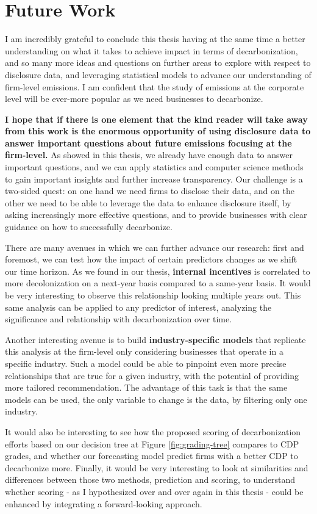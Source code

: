 \section{Future Work}
I am incredibly grateful to conclude this thesis having at the same time a better understanding on what it takes to achieve impact in terms of decarbonization, and so many more ideas and questions on further areas to explore with respect to disclosure data, and leveraging statistical models to advance our understanding of firm-level emissions. I am confident that the study of emissions at the corporate level will be ever-more popular as we need businesses to decarbonize. 

\textbf{I hope that if there is one element that the kind reader will take away from this work is the enormous opportunity of using disclosure data to answer important questions about future emissions focusing at the firm-level.} As showed in this thesis, we already have enough data to answer important questions, and we can apply statistics and computer science methods to gain important insights and further increase transparency. Our challenge is a two-sided quest: on one hand we need firms to disclose their data, and on the other we need to be able to leverage the data to enhance disclosure itself, by asking increasingly more effective questions, and to provide businesses with clear guidance on how to successfully decarbonize. 

There are many avenues in which we can further advance our research: first and foremost, we can test how the impact of certain predictors changes as we shift our time horizon. As we found in our thesis, \textbf{internal incentives} is correlated to more decolonization on a next-year basis compared to a same-year basis. It would be very interesting to observe this relationship looking multiple years out. This same analysis can be applied to any predictor of interest, analyzing the significance and relationship with decarbonization over time. 

Another interesting avenue is to build \textbf{industry-specific models} that replicate this analysis at the firm-level only considering businesses that operate in a specific industry. Such a model could be able to pinpoint even more precise relationships that are true for a given industry, with the potential of providing more tailored recommendation. The advantage of this task is that the same models can be used, the only variable to change is the data, by filtering only one industry. 

It would also be interesting to see how the proposed scoring of decarbonization efforts based on our decision tree at Figure \ref{fig:grading-tree} compares to CDP grades, and whether our forecasting model predict firms with a better CDP to decarbonize more. Finally, it would be very interesting to look at similarities and differences between those two methods, prediction and scoring, to understand whether scoring - as I hypothesized over and over again in this thesis - could be enhanced by integrating a forward-looking approach.